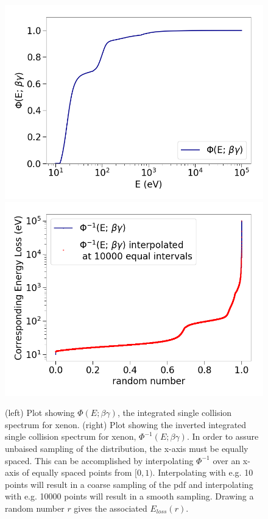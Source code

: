 \begin{figure}[htbp]
\begin{center}
\includegraphics[width=\halffig]{figures/lips/phi.png}
\includegraphics[width=\halffig]{figures/lips/phi_inverted.png}
\caption{(left) Plot showing $\Phi(E; \beta \gamma)$, the integrated single collision spectrum for xenon. (right) Plot showing the inverted integrated single collision spectrum for xenon, $\Phi^{-1}(E; \beta \gamma)$. In order to assure unbaised sampling of the distribution, the x-axis must be equally spaced. This can be accomplished by interpolating $\Phi^{-1}$ over an x-axis of equally spaced points from $[0,1)$. Interpolating with e.g. 10 points will result in a coarse sampling of the \acs{pdf} and interpolating with e.g. 10000 points will result in a smooth sampling. Drawing a random number $r$ gives the associated $E_{loss}(r)$. }
\label{fig:phi}
\end{center}
\end{figure}

